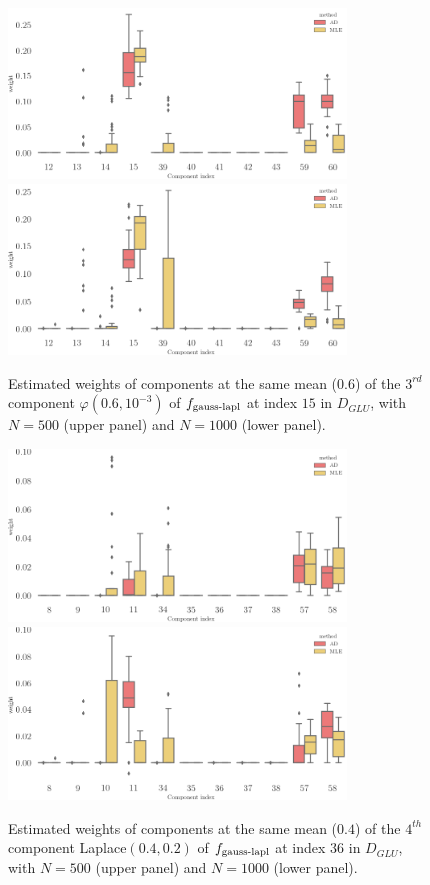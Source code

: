 \begin{figure}
\center
    \includegraphics[width=0.8\textwidth]{./TeX_files/weight_f_gauss_laplace_around_comp_N_500.png}
    \includegraphics[width=0.8\textwidth]{./TeX_files/weight_f_gauss_laplace_around_comp_N_1000.png}
    \caption{Estimated weights of components at the same mean ($0.6$) of the $3^{rd}$ component $\varphi(0.6, 10^{-3})$ of $f_{\textnormal{gauss-lapl}}$ at index $15$ in $D_{GLU}$, with $N=500$ (upper panel) and $N=1000$
    (lower panel).}
    \label{fig:weights_gauss_laplace_around_indexes}
\end{figure}
\begin{figure}
\center
    \includegraphics[width=0.8\textwidth]{./TeX_files/weight_f_gauss_laplace_around3_comp_N_500.png}
    \includegraphics[width=0.8\textwidth]{./TeX_files/weight_f_gauss_laplace_around3_comp_N_1000.png}
    \caption{Estimated weights of components at the same mean ($0.4$) of the $4^{th}$ component Laplace$(0.4, 0.2)$ of $f_{\textnormal{gauss-lapl}}$ at index $36$ in $D_{GLU}$, with $N=500$ (upper panel) and $N=1000$
    (lower panel).}
    \label{fig:weights_gauss_laplace_around3_indexes}
\end{figure}
